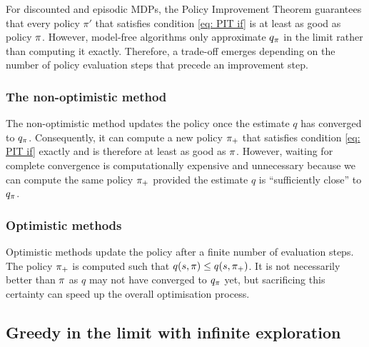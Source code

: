 \vspace{-0.6cm}

For discounted and episodic MDPs, the Policy Improvement Theorem guarantees that every policy $\pi'$ that satisfies condition \eqref{eq: PIT if} is at least as good as policy $\pi$.
However, model-free algorithms only approximate $q_\pi$ in the limit rather than computing it exactly.
Therefore, a trade-off emerges depending on the number of policy evaluation steps that precede an improvement step.


\subsubsection{The non-optimistic method}

The non-optimistic method updates the policy once the estimate $q$ has converged to $q_\pi$.
Consequently, it can compute a new policy $\pi_+$ that satisfies condition \eqref{eq: PIT if} exactly and is therefore at least as good as $\pi$.
However, waiting for complete convergence is computationally expensive and unnecessary because we can compute the same policy $\pi_+$ provided the estimate $q$ is ``sufficiently close'' to $q_\pi$.

\subsubsection{Optimistic methods}

\vspace{-0.2cm}

Optimistic methods update the policy after a finite number of evaluation steps.
The policy $\pi_+$ is computed such that $q(s, \pi) \leq q(s, \pi_+)$. It is not necessarily better than $\pi$ as $q$ may not have converged to $q_\pi$ yet,
but sacrificing this certainty can speed up the overall optimisation process.



\vspace{-0.1cm}

\subsection{Greedy in the limit with infinite exploration}
\label{sec: glie}

